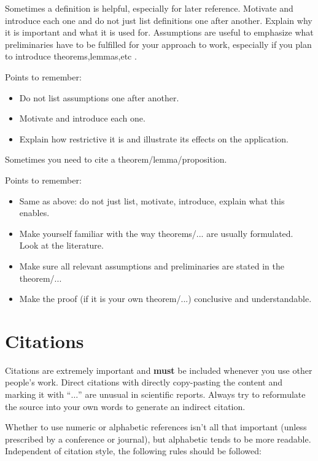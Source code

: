 Sometimes a definition is helpful, especially for later reference. Motivate and introduce each one and do not just list definitions one after another. Explain why it is important and what it is used for. Assumptions are useful to emphasize what preliminaries have to be fulfilled for your approach to work, especially if you plan to introduce theorems,lemmas,etc . 

Points to remember:
\begin{itemize}
	\item Do not list assumptions one after another. 
	\item Motivate and introduce each one.
	\item Explain how restrictive it is and illustrate its effects on the application.
\end{itemize}

Sometimes you need to cite a theorem/lemma/proposition. 

Points to remember:
\begin{itemize}
	\item Same as above: do not just list, motivate, introduce, explain what this enables.
	\item Make yourself familiar with the way theorems/... are usually formulated. Look at the literature. 
	\item Make sure all relevant assumptions and preliminaries are stated in the theorem/...
	\item Make the proof (if it is your own theorem/...) conclusive and understandable.
\end{itemize}



\section{Citations}

Citations are extremely important and \textbf{must} be included whenever you use other people's work. Direct citations with directly copy-pasting the content and marking it with ``$\ldots$'' are unusual in scientific reports. Always try to reformulate the source into your own words to generate an indirect citation. 


Whether to use numeric or alphabetic references isn't all that important (unless prescribed by a conference or journal), but alphabetic tends to be more readable. Independent of citation style, the following rules should be followed:

